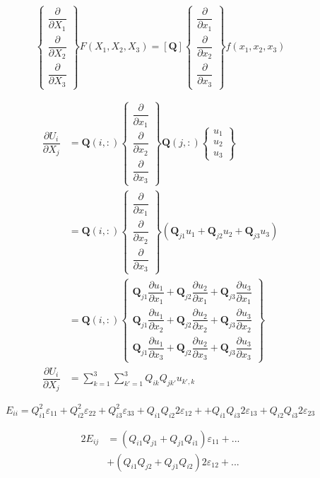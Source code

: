 \documentclass[11pt,A4paper]{book}
\newcommand{\ds}{\displaystyle}
\newcommand{\tb}{\textbf}
\newcommand{\p}{\partial}
\renewcommand{\:}{\tb{:}}
\begin{document}
\begin{equation}
\begin{Bmatrix}
	\dfrac{\p }{\p X_1}\\
	\dfrac{\p }{\p X_2}\\
	\dfrac{\p }{\p X_3}
\end{Bmatrix}F(X_1,X_2,X_3)
	=[\tb{Q}]\begin{Bmatrix}
	\dfrac{\p }{\p x_1}\\
	\dfrac{\p }{\p x_2}\\
	\dfrac{\p }{\p x_3}
\end{Bmatrix}f(x_1,x_2,x_3)
\end{equation}


\begin{align}
	\dfrac{\p U_i}{\p X_j}&=\tb{Q}(i,:)\begin{Bmatrix}
	\dfrac{\p }{\p x_1}\\
	\dfrac{\p }{\p x_2}\\
	\dfrac{\p }{\p x_3}
\end{Bmatrix}\tb{Q}(j,:)\begin{Bmatrix}
		u_1\\
		u_2\\
		u_3
	\end{Bmatrix}
	\\&=\tb{Q}(i,:)\begin{Bmatrix}
	\dfrac{\p }{\p x_1}\\
	\dfrac{\p }{\p x_2}\\
	\dfrac{\p }{\p x_3}
\end{Bmatrix}\left(
\tb{Q}_{j1}u_1+\tb{Q}_{j2}u_2+\tb{Q}_{j3}u_3
\right)\\
&=\tb{Q}(i,:)\begin{Bmatrix}
	\tb{Q}_{j1}\dfrac{\p u_1}{\p x_1}+\tb{Q}_{j2}\dfrac{\p u_2}{\p x_1}+\tb{Q}_{j3}\dfrac{\p u_3}{\p x_1}\\
		\tb{Q}_{j1}\dfrac{\p u_1}{\p x_2}+\tb{Q}_{j2}\dfrac{\p u_2}{\p x_2}+\tb{Q}_{j3}\dfrac{\p u_3}{\p x_2}\\
		\tb{Q}_{j1}\dfrac{\p u_1}{\p x_3}+\tb{Q}_{j2}\dfrac{\p u_2}{\p x_3}+\tb{Q}_{j3}\dfrac{\p u_3}{\p x_3}
\end{Bmatrix}\\
\dfrac{\p U_i}{\p X_j}&=\ds{\sum_{k=1}^3}\ds{\sum_{k'=1}^3} Q_{ik}Q_{jk'}u_{k',k}\end{align}
 

\begin{equation}
	E_{ii}=Q_{i1}^2\varepsilon_{11}+Q_{i2}^2\varepsilon_{22}+Q_{i3}^2\varepsilon_{33}+Q_{i1}Q_{i2} 2\varepsilon_{12}++Q_{i1}Q_{i3} 2\varepsilon_{13}+Q_{i2}Q_{i3} 2\varepsilon_{23}
\end{equation}

\begin{align}
	2E_{ij}&=\left(Q_{i1}Q_{j1}+Q_{j1}Q_{i1}\right) \varepsilon_{11}+...\\
	&+(Q_{i1}Q_{j2}+Q_{j1}Q_{i2})2\varepsilon_{12}+
	...
\end{align}
\end{document}
